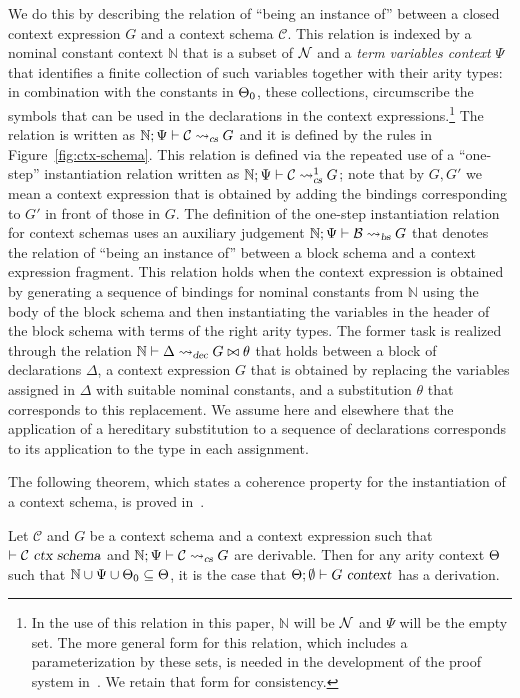 We do this by describing the relation of ``being an instance of''
between a closed context expression $G$ and a context schema $\mathcal{C}$.
%
This relation is indexed by a nominal constant context $\mathbb{N}$
that is a subset of $\mathcal{N}$ and a \emph{term variables context} $\Psi$
that identifies a finite collection of such variables together with their
arity types: in combination with  the constants in $\Theta_0$,
these collections, circumscribe the symbols that can be used in the
declarations in the context expressions.\footnote{In 
  the use of this relation in this paper, $\mathbb{N}$ will
  be $\mathcal{N}$ and $\Psi$ will be the empty set. The more general form
  for this relation, which includes a parameterization by these sets,
  is needed in the development of the proof system
  in~\cite{nadathur21arxiv}. We retain that form for consistency.} 
The relation is written as $\mathbb{N} ; \Psi \vdash \mathcal{C} \leadsto_{\mbox{\sl \scriptsize cs}} G$
and it is defined by the rules in Figure~\ref{fig:ctx-schema}.
%
This relation is defined via the repeated use of a ``one-step''
instantiation relation written as
$\mathbb{N} ; \Psi \vdash \mathcal{C} \leadsto^1_{\mbox{\sl \scriptsize cs}} G$; note that by $G, G'$
we mean a context expression that is obtained by adding the bindings
corresponding to $G'$ in front of those in $G$.
%
The definition of the one-step instantiation relation for context
schemas uses an auxiliary judgement
$\mathbb{N} ; \Psi \vdash \mathcal{B} \leadsto_{\mbox{\sl \scriptsize bs}} G$ that denotes the relation
of ``being an instance of'' between a block 
schema and a context expression fragment.
%
This relation holds when the context expression is obtained by
generating a sequence of bindings for nominal constants from
$\mathbb{N}$ using the body of the block schema and then instantiating
the variables in the header of the block schema with terms of the
right arity types.
%
The former task is realized through the relation
$\mathbb{N} \vdash \Delta \leadsto_{\mbox{\sl \scriptsize dec}} G \bowtie \theta$ that holds between a block of
declarations $\Delta$, a context expression $G$ that is obtained
by replacing the variables assigned in $\Delta$ with
suitable nominal constants, and a substitution $\theta$ that
corresponds to this replacement.
%
We assume here and elsewhere that the application of a hereditary
substitution to a sequence of declarations  corresponds to its
application to the type in each assignment. 

The following theorem, which states a coherence property for the
instantiation of a context schema, is proved
in~\cite{nadathur21arxiv}.

\begin{theorem}\label{th:schemainst}
Let $\mathcal{C}$ and $G$ be a context schema and a context expression
such that $\vdash \mathcal{C}\ \mbox{\sl ctx schema}$ and
$\mathbb{N} ; \Psi \vdash \mathcal{C} \leadsto_{\mbox{\sl \scriptsize cs}} G$ are derivable. Then for
any arity context $\Theta$ such that
$\mathbb{N} \cup \Psi \cup \Theta_0 \subseteq \Theta$, it is the case that 
$\Theta;\emptyset \vdash G\ \mbox{\sl context}$ has a derivation. 
\end{theorem}

